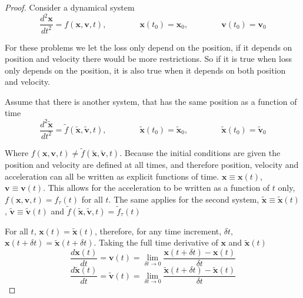 \documentclass{article}
\theoremstyle{remark}
\theoremstyle{definition}
\begin{document}
\begin{proof}
Consider a dynamical system
\begin{equation}
    \frac{d^{2}\mathbf{x}}{dt^{2}} = f(\mathbf{x}, \mathbf{v}, t),
    \qquad\qquad
    \mathbf{x}(t_{0}) = \mathbf{x}_{0}, 
    \qquad\qquad
    \mathbf{v}(t_{0}) = \mathbf{v}_{0}
\end{equation}

For these problems we let the loss only depend on the position, if it depends on position and velocity there would be more restrictions. So if it is true when loss only depends on the position, it is also true when it depends on both position and velocity.

Assume that there is another system, that has the same position as a function of time
\begin{equation}
    \frac{d^{2}\tilde{\mathbf{x}}}{dt^{2}} = \tilde{f}(\tilde{\mathbf{x}}, \tilde{\mathbf{v}}, t),
    \qquad\qquad
    \tilde{\mathbf{x}}(t_{0}) = \tilde{\mathbf{x}}_{0}, 
    \qquad\qquad
    \tilde{\mathbf{x}}(t_{0}) = \tilde{\mathbf{v}}_{0}
\end{equation}

Where $f(\mathbf{x}, \mathbf{v}, t)\neq\tilde{f}(\tilde{\mathbf{x}}, \tilde{\mathbf{v}}, t)$. Because the initial conditions are given the position and velocity are defined at all times, and therefore position, velocity and acceleration can all be written as explicit functions of time. $\mathbf{x} \equiv \mathbf{x}(t)$, $\mathbf{v} \equiv \mathbf{v}(t)$. This allows for the acceleration to be written as a function of $t$ only, $f(\mathbf{x}, \mathbf{v}, t) = f_{\tau}(t)$ for all $t$. The same applies for the second system, $\tilde{\mathbf{x}} \equiv \tilde{\mathbf{x}}(t)$, $\tilde{\mathbf{v}} \equiv \tilde{\mathbf{v}}(t)$ and $\tilde{f}(\tilde{\mathbf{x}}, \tilde{\mathbf{v}}, t) = \tilde{f}_{\tau}(t)$


For all $t$, $\mathbf{x}(t) = \tilde{\mathbf{x}}(t)$, therefore, for any time increment, $\delta t$, $\mathbf{x}(t+\delta t) = \tilde{\mathbf{x}}(t+ \delta t)$. Taking the full time derivative of $\mathbf{x}$ and $\tilde{\mathbf{x}}(t)$
\begin{equation}
    \frac{d\mathbf{x}(t)}{dt} = \mathbf{v}(t) = \lim_{\delta t\to 0}
    \frac{\mathbf{x}(t+\delta t) - \mathbf{x}(t)}{\delta t}
\end{equation}
\begin{equation}
    \frac{d\tilde{\mathbf{x}}(t)}{dt} = \tilde{\mathbf{v}}(t) = \lim_{\delta t\to 0}
    \frac{\tilde{\mathbf{x}}(t+\delta t) - \tilde{\mathbf{x}}(t)}{\delta t}
\end{equation}


\end{proof}
\end{document}
